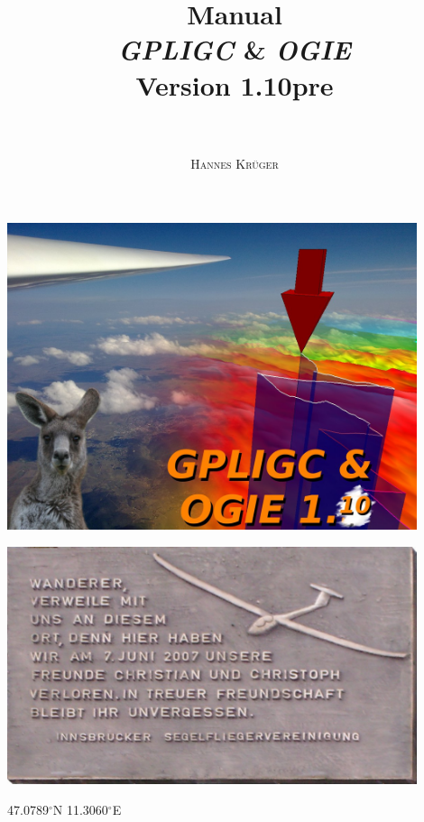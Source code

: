 \documentclass[a4paper,10pt]{article}
\title{
{\huge \textbf{Manual}}\\
\emph{GPLIGC} \& \emph{OGIE}\\
{\small Version 1.10pre}\\ %
~\\
}
\author{\textsc{Hannes Kr\"uger}}
\begin{document}
\maketitle
\begin{center}
\includegraphics[width=12cm]{jpg/logo}
\end{center}

\newpage

\thispagestyle{empty}
\begin{center}
\includegraphics[width=12cm]{png/CC}
\end{center}
47.0789$^\circ$N 11.3060$^\circ$E

\newpage
\tableofcontents
\sloppy





%       
%       
%       






\begin{appendix}






%



\end{appendix}




\end{document}
